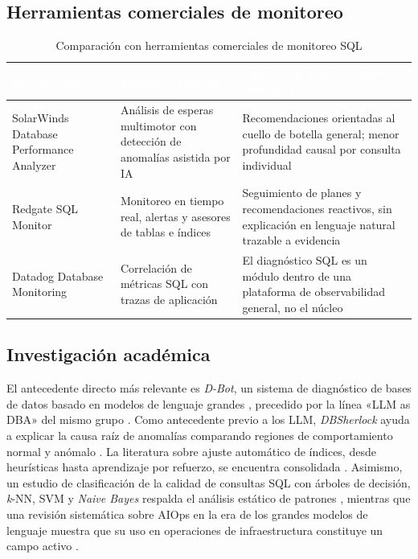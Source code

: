 \documentclass[12pt,a4paper]{article}
\begin{document}
\subsection{Herramientas comerciales de monitoreo}

\begingroup
{}
\begin{table}[H]
\centering
\small
\begin{tabularx}{\textwidth}{p{} p{} X}
\toprule
\rowcolor{utbblue}
\textcolor{white}{\textbf{Herramienta}} & \textcolor{white}{\textbf{Enfoque principal}} & \textcolor{white}{\textbf{Limitación frente a Query Doctor AI}} \\
\midrule
SolarWinds Database Performance Analyzer & Análisis de esperas multimotor con detección de anomalías asistida por IA & Recomendaciones orientadas al cuello de botella general; menor profundidad causal por consulta individual \\
Redgate SQL Monitor & Monitoreo en tiempo real, alertas y asesores de tablas e índices & Seguimiento de planes y recomendaciones reactivos, sin explicación en lenguaje natural trazable a evidencia \cite{sqlyard-2025} \\
Datadog Database Monitoring & Correlación de métricas SQL con trazas de aplicación & El diagnóstico SQL es un módulo dentro de una plataforma de observabilidad general, no el núcleo \cite{idera-2025} \\
\bottomrule
\end{tabularx}
\caption{Comparación con herramientas comerciales de monitoreo SQL}
\label{tab:comerciales}
\end{table}
\endgroup

\subsection{Investigación académica}

El antecedente directo más relevante es \textit{D-Bot}, un sistema de diagnóstico de bases de datos basado en modelos de lenguaje grandes \cite{zhou-dbot}, precedido por la línea «LLM as DBA» del mismo grupo \cite{zhou-llmdba}. Como antecedente previo a los LLM, \textit{DBSherlock} ayuda a explicar la causa raíz de anomalías comparando regiones de comportamiento normal y anómalo \cite{yoon-dbsherlock}. La literatura sobre ajuste automático de índices, desde heurísticas hasta aprendizaje por refuerzo, se encuentra consolidada \cite{zhao-index,ding-index}. Asimismo, un estudio de clasificación de la calidad de consultas SQL con árboles de decisión, \textit{k}-NN, SVM y \textit{Naive Bayes} respalda el análisis estático de patrones \cite{radi-sql}, mientras que una revisión sistemática sobre AIOps en la era de los grandes modelos de lenguaje muestra que su uso en operaciones de infraestructura constituye un campo activo \cite{zhang-aiops}.
\end{document}
